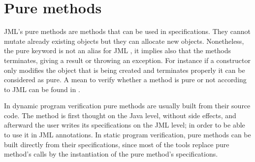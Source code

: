 \section{Pure methods}
JML's pure methods are methods that can be used in specifications.
They cannot mutate already existing objects but they can allocate new objects.
Nonetheless, the pure keyword is not an alias for JML 
, 
it implies also that the methods terminates, giving a result or throwing an 
exception.
For instance if a constructor only modifies the object that is being 
created and terminates properly
it can be considered as pure.
A mean to verify whether a method is pure or not according to JML
can be found in \cite{salcianu05}. 



In dynamic program verification pure methods are usually built from 
their source code. 
The method is first thought on the Java level, without side effects, 
and afterward the user writes its specifications on the JML level; 
in order to be able to use it in JML annotations.
In static program verification,  pure methods can be built directly
from their specifications, since most of the tools replace pure method's calls 
 by the instantiation of the pure method's specifications.


 



